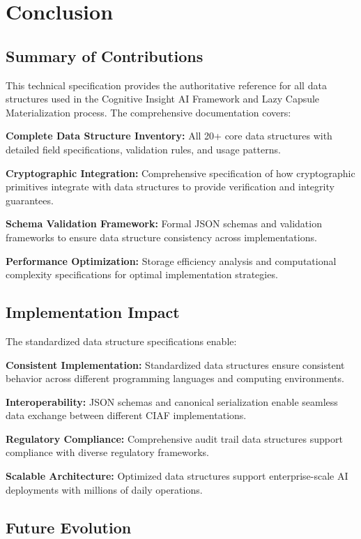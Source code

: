 \documentclass[12pt,a4paper]{article}
\begin{document}
\section{Conclusion}

\subsection{Summary of Contributions}

This technical specification provides the authoritative reference for all data structures used in the Cognitive Insight AI Framework and Lazy Capsule Materialization process. The comprehensive documentation covers:

\textbf{Complete Data Structure Inventory:} All 20+ core data structures with detailed field specifications, validation rules, and usage patterns.

\textbf{Cryptographic Integration:} Comprehensive specification of how cryptographic primitives integrate with data structures to provide verification and integrity guarantees.

\textbf{Schema Validation Framework:} Formal JSON schemas and validation frameworks to ensure data structure consistency across implementations.

\textbf{Performance Optimization:} Storage efficiency analysis and computational complexity specifications for optimal implementation strategies.

\subsection{Implementation Impact}

The standardized data structure specifications enable:

\textbf{Consistent Implementation:} Standardized data structures ensure consistent behavior across different programming languages and computing environments.

\textbf{Interoperability:} JSON schemas and canonical serialization enable seamless data exchange between different CIAF implementations.

\textbf{Regulatory Compliance:} Comprehensive audit trail data structures support compliance with diverse regulatory frameworks.

\textbf{Scalable Architecture:} Optimized data structures support enterprise-scale AI deployments with millions of daily operations.

\subsection{Future Evolution}
\end{document}

